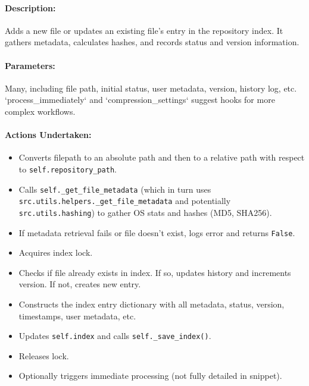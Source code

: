 \documentclass{article}
\begin{document}
\paragraph{Description:} Adds a new file or updates an existing file's entry in the repository index. It gathers metadata, calculates hashes, and records status and version information.
\paragraph{Parameters:} Many, including file path, initial status, user metadata, version, history log, etc. `process_immediately` and `compression_settings` suggest hooks for more complex workflows.
\paragraph{Actions Undertaken:}
\begin{itemize}
    \item Converts filepath to an absolute path and then to a relative path with respect to \texttt{self.repository\_path}.
    \item Calls \texttt{self.\_get\_file\_metadata} (which in turn uses \texttt{src.utils.helpers.\_get\_file_metadata} and potentially \texttt{src.utils.hashing}) to gather OS stats and hashes (MD5, SHA256).
    \item If metadata retrieval fails or file doesn't exist, logs error and returns \texttt{False}.
    \item Acquires index lock.
    \item Checks if file already exists in index. If so, updates history and increments version. If not, creates new entry.
    \item Constructs the index entry dictionary with all metadata, status, version, timestamps, user metadata, etc.
    \item Updates \texttt{self.index} and calls \texttt{self.\_save\_index()}.
    \item Releases lock.
    \item Optionally triggers immediate processing (not fully detailed in snippet).
\end{itemize}
\end{document}
